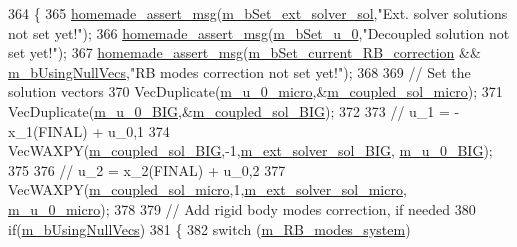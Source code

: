 \begin{DoxyCode}
364 \{
365     \hyperlink{common__header_8h_a593ccc80b790b2268653fcf6597bf451}{homemade\_assert\_msg}(\hyperlink{classcarl_1_1_f_e_t_i___operations_af31024ec972af89dff3472ed65086db5}{m\_bSet\_ext\_solver\_sol},\textcolor{stringliteral}{"Ext. solver
       solutions not set yet!"});
366     \hyperlink{common__header_8h_a593ccc80b790b2268653fcf6597bf451}{homemade\_assert\_msg}(\hyperlink{classcarl_1_1_f_e_t_i___operations_abf724cc3aa790877475fcea5116802b0}{m\_bSet\_u\_0},\textcolor{stringliteral}{"Decoupled solution not set yet!"});
367     \hyperlink{common__header_8h_a593ccc80b790b2268653fcf6597bf451}{homemade\_assert\_msg}(\hyperlink{classcarl_1_1_f_e_t_i___operations_a4ba412e4dc2d64b62ebcf81773ed5ce8}{m\_bSet\_current\_RB\_correction} && 
      \hyperlink{classcarl_1_1_f_e_t_i___operations_aff68699ccceb6e1debc4ecab97dde2ff}{m\_bUsingNullVecs},\textcolor{stringliteral}{"RB modes correction not set yet!"});
368 
369     \textcolor{comment}{// Set the solution vectors}
370     VecDuplicate(\hyperlink{classcarl_1_1_f_e_t_i___operations_a24aa345060f6ae75b71ce2071aa3a093}{m\_u\_0\_micro},&\hyperlink{classcarl_1_1_f_e_t_i___operations_ad1760c083bd94bd64b0137098fe59fa8}{m\_coupled\_sol\_micro});
371     VecDuplicate(\hyperlink{classcarl_1_1_f_e_t_i___operations_ad8097151d30d2d9b8acd6bc67caffcf4}{m\_u\_0\_BIG},&\hyperlink{classcarl_1_1_f_e_t_i___operations_a1eb91fcecaa912934efd6e983a4461a1}{m\_coupled\_sol\_BIG});
372 
373     \textcolor{comment}{// u\_1 = - x\_1(FINAL) + u\_0,1 }
374     VecWAXPY(\hyperlink{classcarl_1_1_f_e_t_i___operations_a1eb91fcecaa912934efd6e983a4461a1}{m\_coupled\_sol\_BIG},-1,\hyperlink{classcarl_1_1_f_e_t_i___operations_a2dc346bc628b1639c0aaa9f3b0c5852d}{m\_ext\_solver\_sol\_BIG},
      \hyperlink{classcarl_1_1_f_e_t_i___operations_ad8097151d30d2d9b8acd6bc67caffcf4}{m\_u\_0\_BIG});
375 
376     \textcolor{comment}{// u\_2 =   x\_2(FINAL) + u\_0,2 }
377     VecWAXPY(\hyperlink{classcarl_1_1_f_e_t_i___operations_ad1760c083bd94bd64b0137098fe59fa8}{m\_coupled\_sol\_micro},1,\hyperlink{classcarl_1_1_f_e_t_i___operations_a4e2a843baafa4a006fe429c2c82c466f}{m\_ext\_solver\_sol\_micro},
      \hyperlink{classcarl_1_1_f_e_t_i___operations_a24aa345060f6ae75b71ce2071aa3a093}{m\_u\_0\_micro});
378 
379     \textcolor{comment}{// Add rigid body modes correction, if needed}
380     \textcolor{keywordflow}{if}(\hyperlink{classcarl_1_1_f_e_t_i___operations_aff68699ccceb6e1debc4ecab97dde2ff}{m\_bUsingNullVecs})
381     \{
382         \textcolor{keywordflow}{switch} (\hyperlink{classcarl_1_1_f_e_t_i___operations_a1ca335075ea08144dd5756ad5969cb08}{m\_RB\_modes\_system})

\end{DoxyCode}
